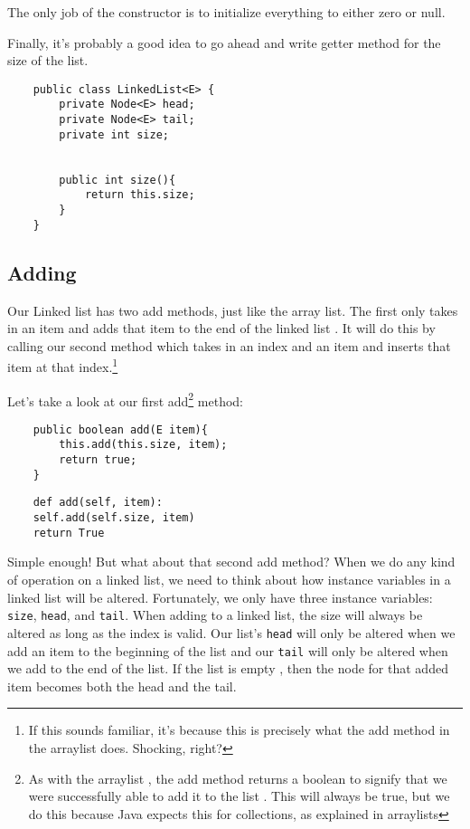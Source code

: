 The only job of the constructor is to initialize everything to either zero or null.

Finally, it's probably a good idea to go ahead and write getter method for the size of the list.

\begin{verbatim}
	public class LinkedList<E> { 
		private Node<E> head;
		private Node<E> tail;
		private int size;
		
		
		public int size(){
			return this.size;
		}
	}
\end{verbatim}






\subsection{Adding}
Our Linked list has two add methods, just like the array list.  The first only takes in an item and adds that item to the end of the linked list . It will do this by calling our second method which takes in an index and an item and inserts that item at that index.\footnote{If this sounds familiar, it's because this is precisely what the add method in the arraylist does. Shocking, right?}

Let's take a look at our first add\footnote{As with the arraylist , the add method returns a boolean to signify that we were successfully able to add it to the list . This will always be true, but we do this because Java expects this for collections, as explained in arraylists } method:

\begin{verbatim}
	public boolean add(E item){
		this.add(this.size, item);
		return true;
	}
\end{verbatim}

\begin{verbatim}
	def add(self, item):
	self.add(self.size, item)
	return True
\end{verbatim}

Simple enough!  But what about that second add method?
When we do any kind of operation on a linked list, we need to think about how instance variables in a linked list will be altered. 
Fortunately, we only have three instance variables: \texttt{size}, \texttt{head}, and \texttt{tail}.
When adding to a linked list, the size will always be altered as long as the index is valid.
Our list's \texttt{head} will only be altered when we add an item to the beginning of the list and our \texttt{tail} will only be altered when we add to the end of the list.  If the list is empty , then the node for that added item becomes both the head and the tail.



